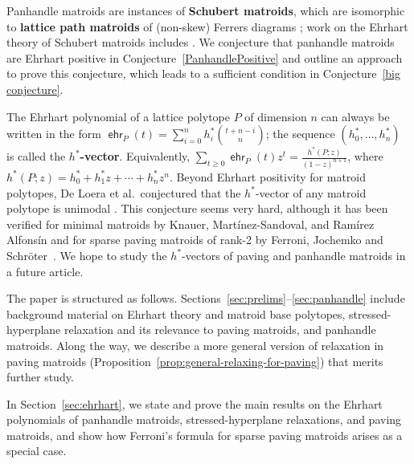 \documentclass[11pt]{amsart}
\theoremstyle{definition}
\newcommand{\0}{\emptyset}
\DeclareMathOperator{\ehr}{\mathsf{ehr}}
\newcommand{\defterm}[1]{\textbf{#1}}
\newcommand{\andres}[1]{\par \noindent
  \framebox{\begin{minipage}[c]{0.95 \textwidth}\color{blue} Andr\'es Note:
      #1 \end{minipage}\color{black}}\par}
\newcommand{\JLM}[1]{\par \noindent
  \framebox{\begin{minipage}[c]{0.95 \textwidth}\color{blue} Jeremy Note:
      #1 \end{minipage}\color{blue}}\par}
\begin{document}
Panhandle matroids are instances of \defterm{Schubert matroids}, which are isomorphic to  \defterm{lattice path matroids} of (non-skew) Ferrers diagrams \cite{LPM}; work on the Ehrhart theory of Schubert matroids includes \cite{Bidkhori,FanLi}.  We conjecture that panhandle matroids are Ehrhart positive in Conjecture~\ref{PanhandlePositive} and outline an approach to prove this conjecture, which leads to a sufficient condition in Conjecture~\ref{big conjecture}.

The Ehrhart polynomial of a lattice polytope $P$ of dimension $n$ can always be written in the form $\ehr_P(t)=\sum_{i=0}^nh_i^*\binom{t+n-i}{n}$; the sequence $(h_0^*,\dots,h_n^*)$ is called the \defterm{$h^*$-vector}. 
Equivalently, $\sum_{t\geq 0}\ehr_P(t)z^t=\frac{h^*(P;z)}{(1-z)^{n+1}}$, where $h^*(P;z)=h_0^*+h_1^*z+\cdots+h_n^*z^n$.
Beyond Ehrhart positivity for matroid polytopes, De Loera et al.\ conjectured that the $h^*$-vector of any matroid polytope is unimodal \cite{DeLoeraHawsKoppe}.  
This conjecture seems very hard, although it has been verified for minimal matroids by Knauer, Mart\'inez-Sandoval, and Ram\'irez Alfons\'in \cite[Thm.~4.9]{KMR} and for sparse paving matroids of rank-2 by Ferroni, Jochemko and Schr\"oter~\cite{FerroniJochemkSchroter}. 
We hope to study the $h^*$-vectors of paving and panhandle matroids in a future article.


The paper is structured as follows.
Sections~\ref{sec:prelims}--\ref{sec:panhandle} include background material on Ehrhart theory and matroid base polytopes, stressed-hyperplane relaxation and its relevance to paving matroids, and panhandle matroids.
Along the way, we describe a more general version of relaxation in paving matroids (Proposition~\ref{prop:general-relaxing-for-paving}) that merits further study.

In Section~\ref{sec:ehrhart}, we state and prove the main results on the Ehrhart polynomials of panhandle matroids, stressed-hyperplane relaxations, and paving matroids, and show how Ferroni's formula for sparse paving matroids arises as a special case.
\end{document}
